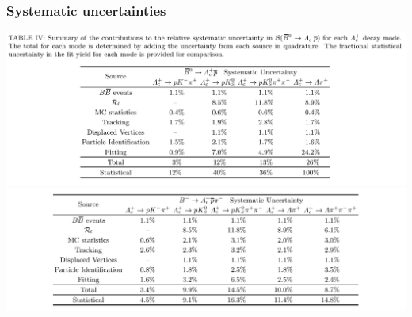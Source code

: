 \documentclass[10pt, aspectratio=169]{beamer}
\begin{document}
\begin{frame}[label=systematics]%
  \frametitle{Systematic uncertainties}
  \centering
  \includegraphics[width=.7\textwidth]{figures/002/table-syst-Lcp}
  \includegraphics[width=.7\textwidth]{figures/002/table-syst-Lcppi-crop}

\end{frame}%
\end{document}
